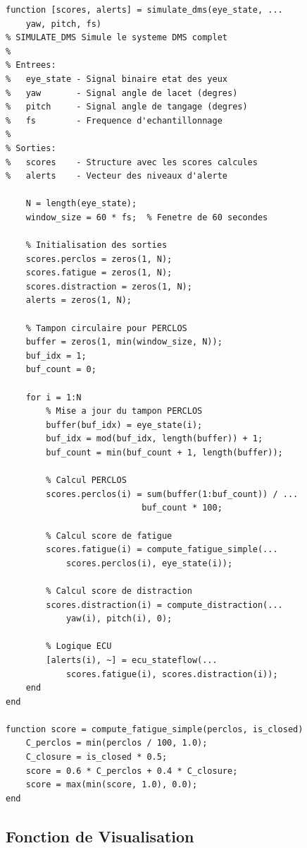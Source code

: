 \documentclass[12pt,a4paper,twoside]{report}
\begin{document}
\begin{lstlisting}[style=matlabstyle, caption={Fonction de simulation DMS.}, label={lst:simulate_dms}]
function [scores, alerts] = simulate_dms(eye_state, ...
    yaw, pitch, fs)
% SIMULATE_DMS Simule le systeme DMS complet
%
% Entrees:
%   eye_state - Signal binaire etat des yeux
%   yaw       - Signal angle de lacet (degres)
%   pitch     - Signal angle de tangage (degres)
%   fs        - Frequence d'echantillonnage
%
% Sorties:
%   scores    - Structure avec les scores calcules
%   alerts    - Vecteur des niveaux d'alerte

    N = length(eye_state);
    window_size = 60 * fs;  % Fenetre de 60 secondes
    
    % Initialisation des sorties
    scores.perclos = zeros(1, N);
    scores.fatigue = zeros(1, N);
    scores.distraction = zeros(1, N);
    alerts = zeros(1, N);
    
    % Tampon circulaire pour PERCLOS
    buffer = zeros(1, min(window_size, N));
    buf_idx = 1;
    buf_count = 0;
    
    for i = 1:N
        % Mise a jour du tampon PERCLOS
        buffer(buf_idx) = eye_state(i);
        buf_idx = mod(buf_idx, length(buffer)) + 1;
        buf_count = min(buf_count + 1, length(buffer));
        
        % Calcul PERCLOS
        scores.perclos(i) = sum(buffer(1:buf_count)) / ...
                           buf_count * 100;
        
        % Calcul score de fatigue
        scores.fatigue(i) = compute_fatigue_simple(...
            scores.perclos(i), eye_state(i));
        
        % Calcul score de distraction
        scores.distraction(i) = compute_distraction(...
            yaw(i), pitch(i), 0);
        
        % Logique ECU
        [alerts(i), ~] = ecu_stateflow(...
            scores.fatigue(i), scores.distraction(i));
    end
end

function score = compute_fatigue_simple(perclos, is_closed)
    C_perclos = min(perclos / 100, 1.0);
    C_closure = is_closed * 0.5;
    score = 0.6 * C_perclos + 0.4 * C_closure;
    score = max(min(score, 1.0), 0.0);
end
\end{lstlisting}

\subsection{Fonction de Visualisation}
\end{document}
